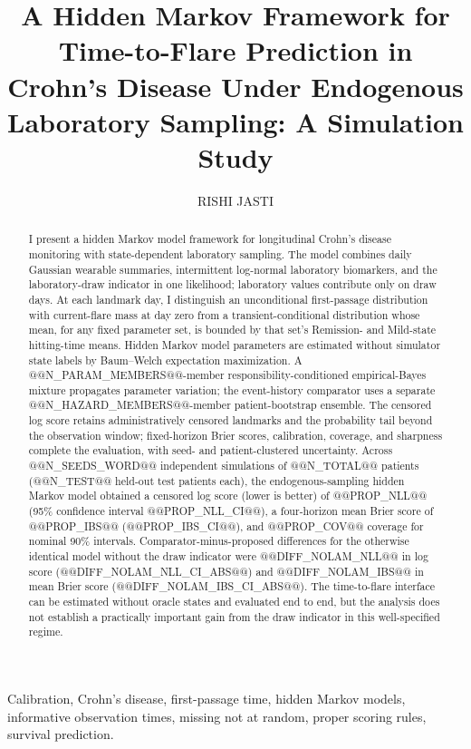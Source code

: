 \documentclass{ieeeaccess}
\title{A Hidden Markov Framework for Time-to-Flare Prediction in Crohn's Disease Under Endogenous Laboratory Sampling: A Simulation Study}
\author{\uppercase{Rishi Jasti}\authorrefmark{1}}
\begin{document}

\begin{abstract}
I present a hidden Markov model framework for longitudinal Crohn's disease monitoring with state-dependent laboratory sampling. The model combines daily Gaussian wearable summaries, intermittent log-normal laboratory biomarkers, and the laboratory-draw indicator in one likelihood; laboratory values contribute only on draw days. At each landmark day, I distinguish an unconditional first-passage distribution with current-flare mass at day zero from a transient-conditional distribution whose mean, for any fixed parameter set, is bounded by that set's Remission- and Mild-state hitting-time means. Hidden Markov model parameters are estimated without simulator state labels by Baum--Welch expectation maximization. A @@N_PARAM_MEMBERS@@-member responsibility-conditioned empirical-Bayes mixture propagates parameter variation; the event-history comparator uses a separate @@N_HAZARD_MEMBERS@@-member patient-bootstrap ensemble. The censored log score retains administratively censored landmarks and the probability tail beyond the observation window; fixed-horizon Brier scores, calibration, coverage, and sharpness complete the evaluation, with seed- and patient-clustered uncertainty. Across @@N_SEEDS_WORD@@ independent simulations of @@N_TOTAL@@ patients (@@N_TEST@@ held-out test patients each), the endogenous-sampling hidden Markov model obtained a censored log score (lower is better) of @@PROP_NLL@@ (95\% confidence interval @@PROP_NLL_CI@@), a four-horizon mean Brier score of @@PROP_IBS@@ (@@PROP_IBS_CI@@), and @@PROP_COV@@ coverage for nominal 90\% intervals. Comparator-minus-proposed differences for the otherwise identical model without the draw indicator were @@DIFF_NOLAM_NLL@@ in log score (@@DIFF_NOLAM_NLL_CI_ABS@@) and @@DIFF_NOLAM_IBS@@ in mean Brier score (@@DIFF_NOLAM_IBS_CI_ABS@@). The time-to-flare interface can be estimated without oracle states and evaluated end to end, but the analysis does not establish a practically important gain from the draw indicator in this well-specified regime.
\end{abstract}

\begin{IEEEkeywords}
Calibration, Crohn's disease, first-passage time, hidden Markov models, informative observation times, missing not at random, proper scoring rules, survival prediction.
\end{IEEEkeywords}
\end{document}
